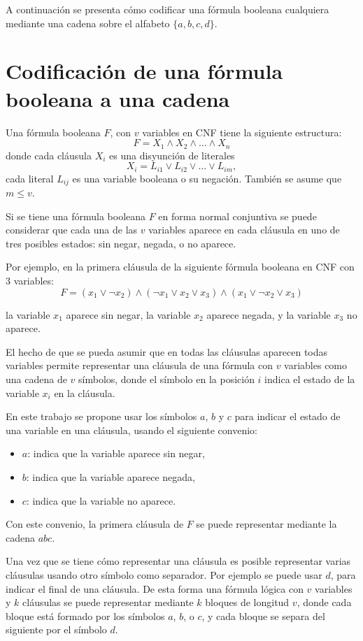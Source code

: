 \documentclass[12pt]{article}
\begin{document}
A continuación se presenta cómo codificar una fórmula booleana cualquiera mediante una cadena sobre el alfabeto $\{a,b,c,d\}$.

\section{Codificación de una fórmula booleana a una cadena}
\label{sec:codsat}

Una fórmula booleana $F$, con $v$ variables en CNF tiene la siguiente estructura:
$$F=X_1 \wedge X_2 \wedge \ldots \wedge X_n$$
donde cada cláusula $X_i$ es una disyunción de literales
$$X_i=L_{i1} \vee L_{i2} \vee \ldots \vee L_{im},$$
cada literal $L_{ij}$ es una variable booleana o su negación. También se asume que $m\leq v$. 

Si se tiene una fórmula booleana $F$ en forma normal conjuntiva se puede considerar que cada una de las $v$ variables aparece en cada cláusula en uno de tres posibles estados: sin negar, negada, o no aparece.

Por ejemplo, en la primera cláusula de la siguiente fórmula booleana en CNF con 3 variables:
$$F=(x_1 \vee \neg x_2) \wedge (\neg x_1 \vee x_2 \vee x_3) \wedge (x_1 \vee \neg x_2 \vee x_3)$$

la variable $x_1$ aparece sin negar, la variable $x_2$ aparece negada, y la variable $x_{3}$ no aparece.

El hecho de que se pueda asumir que en todas las cláusulas aparecen todas variables permite representar una cláusula de una fórmula con $v$ variables como una cadena de $v$ símbolos, donde el símbolo en la posición $i$ indica el estado de la variable $x_i$ en la cláusula.

En este trabajo se propone usar los símbolos $a$, $b$ y $c$ para indicar el estado de una variable en una cláusula, usando el siguiente convenio:

\begin{itemize}
    \item $a$: indica que la variable aparece sin negar,
    \item $b$: indica que la variable aparece negada,
    \item $c$: indica que la variable no aparece.
\end{itemize}

Con este convenio, la primera cláusula de $F$ se puede representar mediante la cadena $abc$.

Una vez que se tiene cómo representar una cláusula es posible representar varias cláusulas usando otro símbolo como separador.
Por ejemplo se puede usar $d$, para indicar el final de una cláusula. De esta forma una fórmula lógica con $v$ variables y $k$ cláusulas se puede representar mediante $k$ bloques de longitud $v$, donde cada bloque está formado por los símbolos $a$, $b$, o $c$, y cada bloque se separa del siguiente por el símbolo $d$.
\end{document}

